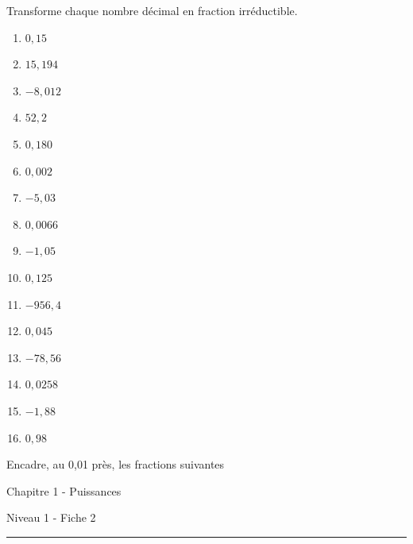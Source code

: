 \begin{exercise}
  Transforme chaque nombre décimal en fraction irréductible.
\begin{enumerate}[cols=3]
  \item \(0,15 \)
  \item \(15,194\)
  \item \(-8,012\)
  \item \(52,2\)
  
  \item \(0,180\)
  \item \(0,002\)
  \item \(-5,03 \)
  \item \(0,0066\)
  
  \item \(-1,05\)
  \item \(0,125\)
  \item \(-956,4\)
  \item \(0,045\)
  
  \item \(-78,56\)
  \item \(0,0258\)
  \item \(-1,88\)
  \item \(0,98\)
\end{enumerate}
\end{exercise}

\begin{exercise}
  Encadre, au 0,01 près, les fractions suivantes
  \begin{enumerate}[cols=3]
    \item $\dfrac{7}{10}$
    \item $\dfrac{9}{7}$
    \item $\dfrac{-11}{12}$
    \item $\dfrac{6}{7}$
    \item $\dfrac{1}{6$
    
    \item $\dfrac{-15}{14}$
    \item $\dfrac{3}{8}$
    \item $\dfrac{18}{19}$
    \item $\dfrac{9}{13}$
    \item $\dfrac{-6}{-11}$
  \end{enumerate}
\end{exercise}



\newpage

\begin{center}
  \bfseries
  \begin{Huge}
    Chapitre 1 - Puissances
  \end{Huge}
  \smallbreak
  \begin{large}
    Niveau 1  - Fiche 2
  \end{large}
  \smallbreak
  \rule[10pt]{.5\linewidth}{1 pt}
\end{center}

